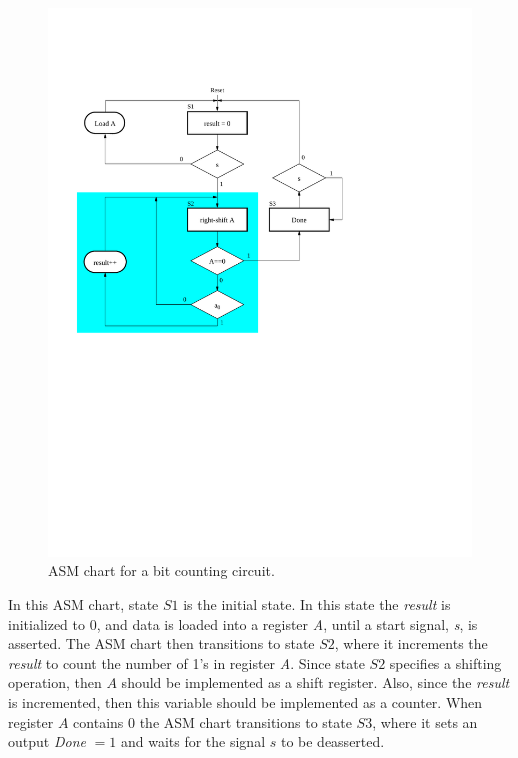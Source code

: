 \documentclass[epsfig,10pt,fullpage]{article}
\begin{document}
\begin{figure}[H]
\begin{center}
\includegraphics{figures/bit_counting_asm}
\end{center}
\caption{ASM chart for a bit counting circuit.}
\label{fig:bit_counting_asm}
\end{figure}

In this ASM chart, state $S1$ is the initial state. In this state the {\it result} is
initialized to 0, and data is loaded into a register {\it A}, until a start signal,
{\it s}, is asserted.  The ASM chart then transitions to state $S2$, where it increments
the {\it result} to count the number of 1's in register {\it A}. Since state $S2$
specifies a shifting operation, then $A$ should be implemented as a shift register. 
Also, since the {\it result} is incremented, then this variable should be implemented as a
counter.  When register $A$ contains 0 the ASM chart transitions to state $S3$, where it sets an 
output {\it Done} $=1$ and waits for the signal $s$ to be deasserted.
\end{document}
